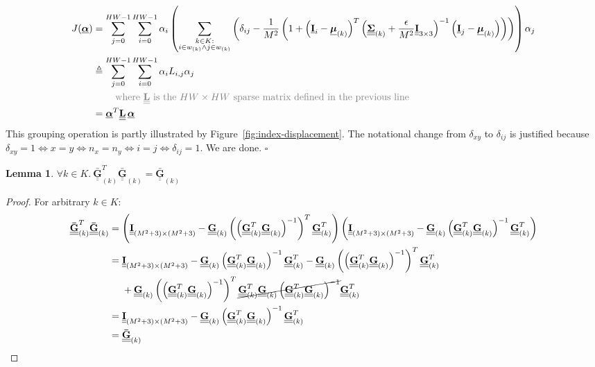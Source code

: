 \documentclass{article}
\theoremstyle{definition}
\newtheorem{lemma}[theorem]{Lemma}
\newcommand{\textgrey}[1]{\textcolor{gray}{#1}}
\def\vt#1{\underline{\mathbf{#1}}}
\def\vts#1{\underline{\boldsymbol{#1}}}
\def\mt#1{\underline{\underline{\mathbf{#1}}}}
\def\mts#1{\underline{\underline{\boldsymbol{#1}}}}
\begin{document}
\begin{align*}
    J(\vts\alpha) &= \sum_{j=0}^{HW-1} \sum_{i=0}^{HW-1} \alpha_i \left(\sum_{\substack{k\in K:\\i\in w_{(k)}\wedge j\in w_{(k)}}} \left( \delta_{ij} - \frac1{M^2}\left(1 + \left(\vt{I}_{i} - \vts \mu_{(k)}\right)^T \left(\mts \Sigma_{(k)} + \frac\epsilon{M^2} \mt{I}_{3\times 3}\right)^{-1} \left(\vt{I}_{j} - \vts \mu_{(k)}\right) \right) \right)\right) \alpha_j\\
    &\triangleq \sum_{j=0}^{HW-1} \sum_{i=0}^{HW-1} \alpha_i L_{i,j} \alpha_j\\
    &\quad\quad\ \textgrey{\text{where $\mt L$ is the $HW\times HW$ sparse matrix defined in the previous line}}\\
    &= \vts \alpha^T \mt L\, \vts \alpha
\end{align*}
This grouping operation is partly illustrated by Figure~\ref{fig:index-displacement}. The notational change from $\delta_{xy}$ to $\delta_{ij}$ is justified because $\delta_{xy} = 1 \iff x=y \iff n_x = n_y \iff i = j \iff \delta_{ij}=1$. We are done. \hfill$\square$


\begin{lemma}\label{lemma1}
    $\forall k \in K.\ \mt{\bar{G}}_{(k)}^T \mt{\bar{G}}_{(k)} = \mt{\bar{G}}_{(k)}$
    \begin{proof}
        For arbitrary $k\in K$:
        \begin{align*}
            \mt{\bar{G}}_{(k)}^T \mt{\bar{G}}_{(k)} &= \left(\mt I_{(M^2+3)\times(M^2+3)} -  \mt G_{(k)} \left(\left(\mt G_{(k)}^T \mt G_{(k)} \right)^{-1}\right)^T \mt G_{(k)}^T \right) \left(\mt I_{(M^2+3)\times(M^2+3)} -  \mt G_{(k)}\left(\mt G_{(k)}^T \mt G_{(k)} \right)^{-1} \mt G_{(k)}^T \right)\\
            &= \mt I_{(M^2+3)\times(M^2+3)} - \mt G_{(k)}\left(\mt G_{(k)}^T \mt G_{(k)} \right)^{-1} \mt G_{(k)}^T - \mt G_{(k)} \left(\left(\mt G_{(k)}^T \mt G_{(k)} \right)^{-1}\right)^T \mt G_{(k)}^T \\
            &\quad\ + \mt G_{(k)} \left(\left(\mt G_{(k)}^T \mt G_{(k)} \right)^{-1}\right)^T \cancel{\mt G_{(k)}^T \mt G_{(k)}\left(\mt G_{(k)}^T \mt G_{(k)} \right)^{-1}} \mt G_{(k)}^T \\
            &= \mt I_{(M^2+3)\times(M^2+3)} - \mt G_{(k)}\left(\mt G_{(k)}^T \mt G_{(k)} \right)^{-1} \mt G_{(k)}^T \\
            &= \mt{\bar{G}}_{(k)}
        \end{align*}
    \end{proof}
\end{lemma}
\end{document}
